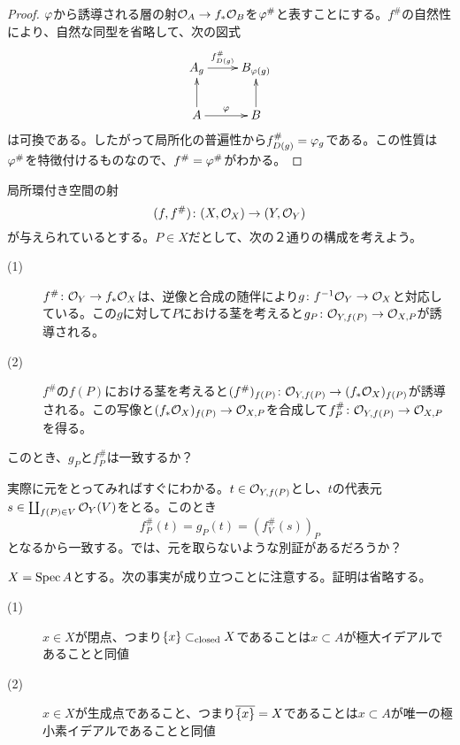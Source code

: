 \begin{proof}
  ${\varphi}$から誘導される層の射$\mathcal{O}_A \to f_*\mathcal{O}_B$を${\varphi}^{\#}$と表すことにする。$f^{\#}$の自然性により、自然な同型を省略して、次の図式
  \[
  \xymatrix{
  A_g \ar[r]^-{ f^{\#}_{D(g)} } & B_{\vp(g)} \\
  A \ar[u] \ar[r]^-{\vp} & B \ar[u]
  }
  \]
  は可換である。したがって局所化の普遍性から$f^{\#}_{D(g)} = {\varphi}_g$である。この性質は${\varphi}^{\#}$を特徴付けるものなので、$f^{\#} = {\varphi}^{\#}$がわかる。
\end{proof}


\begin{que}
  局所環付き空間の射
  \[
  (f,f^{\#}) \colon (X,\mathcal{O}_X) \to (Y,\mathcal{O}_Y)
  \]
  が与えられているとする。$P \in X$だとして、次の２通りの構成を考えよう。
  \begin{description}
    \item[(1)] $f^{\#} \colon \mathcal{O}_Y \to f_* \mathcal{O}_X$は、逆像と合成の随伴により$g \colon f^{-1}\mathcal{O}_Y \to \mathcal{O}_X$と対応している。この$g$に対して$P$における茎を考えると$g_P \colon \mathcal{O}_{Y,f(P)} \to \mathcal{O}_{X,P}$が誘導される。
    \item[(2)] $f^{\#}$の$f(P)$における茎を考えると$(f^{\#})_{f(P)} \colon \mathcal{O}_{Y,f(P)} \to (f_* \mathcal{O}_X)_{f(P)}$が誘導される。この写像と$(f_* \mathcal{O}_X)_{f(P)} \to \mathcal{O}_{X,P}$を合成して$f^{\#}_P \colon \mathcal{O}_{Y,f(P)} \to \mathcal{O}_{X,P}$を得る。
  \end{description}
  このとき、$g_P$と$f^{\#}_P$は一致するか？
\end{que}
\begin{sol}
  実際に元をとってみればすぐにわかる。$t \in \mathcal{O}_{Y,f(P)}$とし、$t$の代表元$s \in \coprod_{f(P) \in V} \mathcal{O}_Y(V)$をとる。このとき
  \[
  f^{\#}_P (t) = g_P(t) = (f^{\#}_V(s))_P
  \]
  となるから一致する。では、元を取らないような別証があるだろうか？
\end{sol}






\begin{rem}
  $X = \operatorname{Spec} A$とする。次の事実が成り立つことに注意する。証明は省略する。
  \begin{description}
    \item[(1)] $x \in X$が閉点、つまり$\{x \} \subset_{\text{closed}} X$であることは$x \subset A$が極大イデアルであることと同値
    \item[(2)] $x \in X$が生成点であること、つまり$\overline{\{x\}}=X$であることは$x \subset A$が唯一の極小素イデアルであることと同値
  \end{description}
\end{rem}
